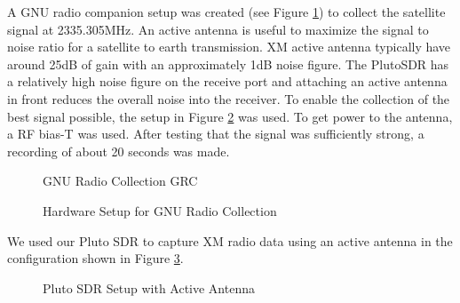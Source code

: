 \documentclass[conference,onecolumn]{IEEEtran}
\begin{document}
A GNU radio companion setup was created (see Figure \ref{fig::gnu_collect}) to collect the satellite signal at 2335.305MHz.  An active antenna is useful to maximize the signal to noise ratio for a satellite to earth transmission.  XM active antenna typically have around 25dB of gain with an approximately 1dB  noise figure.  The PlutoSDR has a relatively high noise figure on the receive port and attaching an active antenna in front reduces the overall noise into the receiver.  To enable the collection of the best signal possible, the setup in Figure \ref{fig::gnu_hardware} was used.  To get power to the antenna, a RF bias-T was used.  After testing that the signal was sufficiently strong, a recording of about 20 seconds was made.
\begin{figure}[H]
	\centerline{}
	\caption{GNU Radio Collection GRC}
	\label{fig::gnu_collect}
\end{figure}
\begin{figure}[H]
	\centerline{}
	\caption{Hardware Setup for GNU Radio Collection}
	\label{fig::gnu_hardware}
\end{figure}

We used our Pluto SDR to capture XM radio data using an active antenna in the configuration shown in Figure \ref{fig::active_antenna_setup}.

\begin{figure}[H]
	\centerline{}
	\caption{Pluto SDR Setup with Active Antenna}
	\label{fig::active_antenna_setup}
\end{figure}
\end{document}
